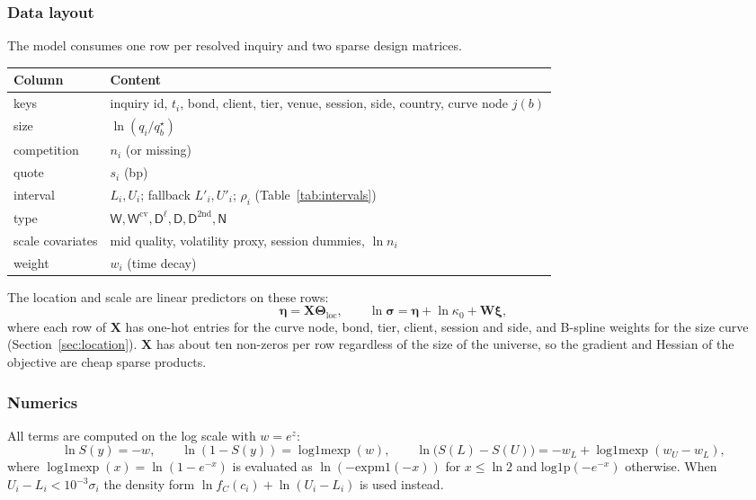 \documentclass[11pt,a4paper]{article}
\theoremstyle{definition}
\theoremstyle{remark}
\newcommand{\btheta}{\bm{\Theta}}
\newcommand{\Win}{\mathsf{W}}
\newcommand{\Wc}{\mathsf{W}^{\mathrm{cv}}}
\newcommand{\Dl}{\mathsf{D}^{\ell}}
\newcommand{\Dn}{\mathsf{D}}
\newcommand{\Dcv}{\mathsf{D}^{\mathrm{2nd}}}
\newcommand{\NT}{\mathsf{N}}
\newcommand{\lmexp}{\operatorname{log1mexp}}
\begin{document}
\subsubsection{Data layout}
The model consumes one row per resolved inquiry and two sparse design matrices.
\begin{center}
\small
\begin{tabularx}{\textwidth}{lX}
\toprule
Column & Content \\
\midrule
keys & inquiry id, $t_i$, bond, client, tier, venue, session, side, country, curve node $j(b)$ \\
size & $\ln(q_i/q^\star_b)$ \\
competition & $n_i$ (or missing) \\
quote & $s_i$ (bp) \\
interval & $L_i,U_i$; fallback $L'_i,U'_i$; $\rho_i$ (Table~\ref{tab:intervals}) \\
type & $\Win,\Wc,\Dl,\Dn,\Dcv,\NT$ \\
scale covariates & mid quality, volatility proxy, session dummies, $\ln n_i$ \\
weight & $w_i$ (time decay) \\
\bottomrule
\end{tabularx}
\end{center}
The location and scale are linear predictors on these rows:
\begin{equation}\label{eq:design}
\bm\eta=\bm X\btheta_{\mathrm{loc}},\qquad \ln\bm\sigma=\bm\eta+\ln\kappa_0+\bm W\bm\xi,
\end{equation}
where each row of $\bm X$ has one-hot entries for the curve node, bond, tier, client, session and side, and B-spline weights for the size curve (Section~\ref{sec:location}). $\bm X$ has about ten non-zeros per row regardless of the size of the universe, so the gradient and Hessian of the objective are cheap sparse products.

\subsubsection{Numerics}
All terms are computed on the log scale with $w=e^{z}$:
\[
\ln S(y)=-w,\qquad \ln(1-S(y))=\lmexp(w),\qquad \ln\bigl(S(L)-S(U)\bigr)=-w_L+\lmexp(w_U-w_L),
\]
where $\lmexp(x)=\ln(1-e^{-x})$ is evaluated as $\ln(-\mathrm{expm1}(-x))$ for $x\le\ln2$ and $\mathrm{log1p}(-e^{-x})$ otherwise. When $U_i-L_i<10^{-3}\sigma_i$ the density form $\ln f_C(c_i)+\ln(U_i-L_i)$ is used instead.

\end{document}
